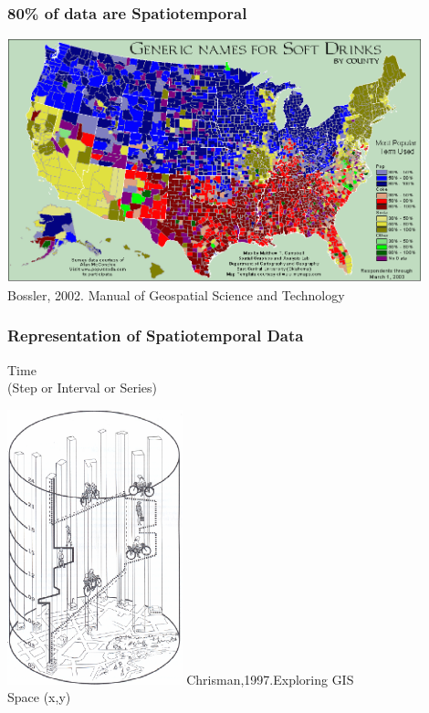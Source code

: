 \documentclass{beamer}
\begin{document}

\begin{frame}
\frametitle{80\% of data are Spatiotemporal}
\centering
\includegraphics[width=0.9\textwidth]{Figures/softdrinks.png}\\
Bossler, 2002. Manual of Geospatial Science and Technology
\end{frame}


\begin{frame}
\frametitle{Representation of Spatiotemporal Data}
\centering
{}\begin{turn}{90}
\begin{minipage}[c]{6cm}
\centering
\hspace{0.8cm} Time\\\hspace{0.8cm} (Step or Interval or Series)
\end{minipage}
\end{turn}
\includegraphics[width=0.38\textwidth]{Figures/RepGI.png} \hspace{1cm} \alert{\footnotesize Chrisman,1997.Exploring GIS}\\
\hspace{-3.5cm} Space (x,y)
\end{frame}
\end{document}
